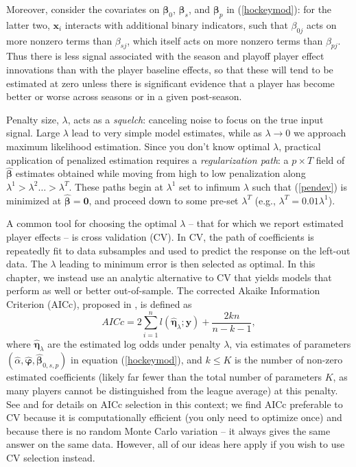 Moreover, consider the covariates on $\boldsymbol{\beta}_0$,
$\boldsymbol{\beta}_s$, and $\boldsymbol{\beta}_p$ in (\ref{hockeymod}): for the latter two,
 $\mathbf{x}_i$ interacts with additional binary indicators, such that
$\beta_{0j}$ acts on more nonzero terms than $\beta_{sj}$, which itself acts
on more nonzero terms than $\beta_{pj}$.  Thus there is  less signal
associated with the season and playoff player effect innovations than with the
player baseline effects, so that these will tend to be estimated at zero unless
there is significant evidence that a player has become better or worse across
seasons or in a given post-season.

Penalty size, $\lambda$, acts as a {\it squelch}: canceling noise to
focus on the true input signal. Large $\lambda$ lead to very simple  model
estimates, while as $\lambda \rightarrow 0$ we approach maximum likelihood
estimation. Since you don't know optimal $\lambda$, practical
application of penalized estimation requires a {\it regularization path}: a $p
\times T$ field of $\boldsymbol{\hat\beta}$ estimates obtained while moving
from high to low penalization along $\lambda^1 > \lambda^2 \ldots >
\lambda^T$. These paths begin at $\lambda^1$ set to infimum $\lambda$ such
that (\ref{pendev}) is minimized at $\boldsymbol{\hat\beta} = \mathbf{0}$, and proceed
down to some pre-set $\lambda^T$ (e.g., $\lambda^T= 0.01\lambda^1$).

 A common tool for choosing the optimal $\lambda$ -- that for which we report
 estimated player effects -- is cross validation (CV).  In CV, the path of
 coefficients is repeatedly fit to data subsamples and used to predict the
 response on the left-out data. The $\lambda$ leading to minimum error is then
 selected as optimal.  In this chapter, we instead use an analytic alternative
 to CV that yields models that perform as well or better out-of-sample.   The
 corrected Akaike Information Criterion (AICc), proposed in
 \cite{hurvich_regression_1989}, is defined as
\begin{equation*}
AICc = 2\sum_{i=1}^{n} l(\boldsymbol{\hat\eta}_{\lambda};\mathbf{y}) + \frac{2kn}{n-k-1},
\end{equation*}
where $\boldsymbol{\hat\eta}_{\lambda}$ are the estimated log odds under
penalty $\lambda$, via estimates of parameters $(\hat{\alpha}, \hat{\boldsymbol{\varphi}}, \hat{\boldsymbol{\beta}}_{0,s,p})$
in equation (\ref{hockeymod}), 
and $k \leq K$ is the number of non-zero estimated
coefficients (likely far fewer than the total number of parameters $K$, as
many players cannot be distinguished from the league average) at this penalty.
See \cite{taddy_one-step_2015} and \cite{flynn_efficiency_2013} for details on
AICc selection in this context; we find AICc preferable to CV because it is
computationally efficient (you only need to optimize once) and because there
is no random Monte Carlo variation -- it always gives the same answer on the
same data.  However, all of our ideas here apply if you wish to use CV
selection instead.

